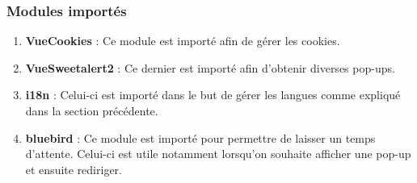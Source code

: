 \subsubsection{Modules importés}
\begin{enumerate}[-]
\item \textbf{VueCookies} :\newline
Ce module est importé afin de gérer les cookies.
\item \textbf{VueSweetalert2} :\newline
Ce dernier est importé afin d'obtenir diverses pop-ups.
\item \textbf{i18n} :\newline
Celui-ci est importé dans le but de gérer les langues comme expliqué dans la section précédente.
\item \textbf{bluebird} :\newline
Ce module est importé pour permettre de laisser un temps d'attente.\newline
Celui-ci est utile notamment lorsqu'on souhaite afficher une pop-up et ensuite rediriger.
\end{enumerate} 
